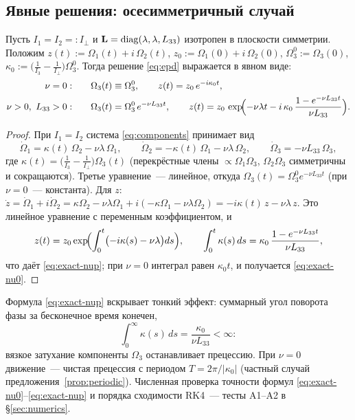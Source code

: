 \subsection{Явные решения: осесимметричный случай}

\begin{proposition}\label{prop:axisym}
Пусть $I_1 = I_2 =: I_\perp$ и $\mathbf{L} = \operatorname{diag}(\lambda,\lambda,L_{33})$
изотропен в плоскости симметрии. Положим
$z(t) := \Omega_1(t) + i\,\Omega_2(t)$,
$z_0 := \Omega_1(0) + i\,\Omega_2(0)$,
$\Omega_3^0 := \Omega_3(0)$,
$\kappa_0 := \bigl(\tfrac1{I_3}-\tfrac1{I_\perp}\bigr)\Omega_3^0$.
Тогда решение \eqref{eq:epd} выражается в явном виде:
\begin{align}
  \nu = 0:\qquad & \Omega_3(t) \equiv \Omega_3^0, \qquad
    z(t) = z_0\,e^{-i\kappa_0 t}, \label{eq:exact-nu0}\\
  \nu > 0,\ L_{33} > 0:\qquad & \Omega_3(t) = \Omega_3^0\,e^{-\nu L_{33}t},
    \qquad z(t) = z_0\,
    \exp\!\Bigl(-\nu\lambda t - i\,\kappa_0\,
    \frac{1-e^{-\nu L_{33}t}}{\nu L_{33}}\Bigr). \label{eq:exact-nup}
\end{align}
\end{proposition}

\begin{proof}
При $I_1 = I_2$ система \eqref{eq:components} принимает вид
\[
  \dot\Omega_1 = \kappa(t)\,\Omega_2 - \nu\lambda\,\Omega_1,\qquad
  \dot\Omega_2 = -\kappa(t)\,\Omega_1 - \nu\lambda\,\Omega_2,\qquad
  \dot\Omega_3 = -\nu L_{33}\,\Omega_3,
\]
где $\kappa(t) = \bigl(\tfrac1{I_3}-\tfrac1{I_\perp}\bigr)\Omega_3(t)$
(перекрёстные члены $\propto \Omega_1\Omega_3$, $\Omega_2\Omega_3$
симметричны и сокращаются). Третье уравнение~--- линейное, откуда
$\Omega_3(t) = \Omega_3^0e^{-\nu L_{33}t}$ (при $\nu = 0$~---
константа). Для $z$: $\dot z = \dot\Omega_1 + i\dot\Omega_2
= \kappa\Omega_2 - \nu\lambda\Omega_1 + i(-\kappa\Omega_1 - \nu\lambda\Omega_2)
= -i\kappa(t)\,z - \nu\lambda\,z$. Это линейное уравнение с переменным
коэффициентом, и
\[
  z(t) = z_0\exp\!\Bigl(\int_0^t\bigl(-i\kappa(s) - \nu\lambda\bigr)ds\Bigr),
  \qquad
  \int_0^t \kappa(s)\,ds = \kappa_0\,\frac{1-e^{-\nu L_{33}t}}{\nu L_{33}},
\]
что даёт \eqref{eq:exact-nup}; при $\nu = 0$ интеграл равен $\kappa_0 t$,
и получается \eqref{eq:exact-nu0}.
\end{proof}

\begin{remark}
Формула \eqref{eq:exact-nup} вскрывает тонкий эффект: суммарный угол
поворота фазы за бесконечное время конечен,
\[
  \int_0^\infty \kappa(s)\,ds = \frac{\kappa_0}{\nu L_{33}} < \infty :
\]
вязкое затухание компоненты $\Omega_3$ останавливает прецессию.
При $\nu = 0$ движение~--- чистая прецессия с периодом
$T = 2\pi/|\kappa_0|$ (частный случай
предложения~\ref{prop:periodic}). Численная проверка точности формул
\eqref{eq:exact-nu0}--\eqref{eq:exact-nup} и порядка сходимости RK4~---
тесты A1--A2 в \S\ref{sec:numerics}.
\end{remark}

